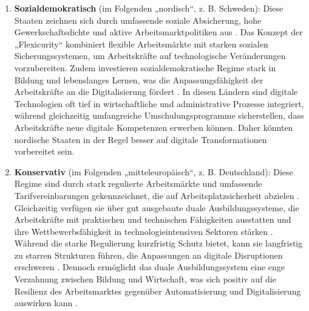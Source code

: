 \begin{enumerate}

    \item \textbf{Sozialdemokratisch} (im Folgenden „nordisch“, z. B. Schweden): Diese 
    Staaten zeichnen sich durch umfassende soziale Absicherung, hohe Gewerkschaftsdichte 
    und aktive Arbeitsmarktpolitiken aus \parencite[vgl.][S. 26]{espingandersen1990thethree}. 
    Das Konzept der „Flexicurity“ kombiniert flexible Arbeitsmärkte mit starken sozialen 
    Sicherungssystemen, um Arbeitskräfte auf technologische Veränderungen vorzubereiten. 
    Zudem investieren sozialdemokratische Regime stark in Bildung und lebenslanges Lernen, 
    was die Anpassungsfähigkeit der Arbeitskräfte an die Digitalisierung fördert 
    \parencite[vgl.][S. 56]{espingandersen1990thethree}. In diesen Ländern sind digitale 
    Technologien oft tief in wirtschaftliche und administrative Prozesse integriert, während 
    gleichzeitig umfangreiche Umschulungsprogramme sicherstellen, dass Arbeitskräfte neue 
    digitale Kompetenzen erwerben können. Daher könnten nordische Staaten in der Regel 
    besser auf digitale Transformationen vorbereitet sein.

    \item \textbf{Konservativ} (im Folgenden „mitteleuropäisch“, z. B. Deutschland): Diese 
    Regime sind durch stark regulierte Arbeitsmärkte und umfassende Tarifvereinbarungen 
    gekennzeichnet, die auf Arbeitsplatzsicherheit abzielen 
    \parencite[vgl.][S. 27]{espingandersen1990thethree}. Gleichzeitig verfügen sie über 
    gut ausgebaute duale Ausbildungssysteme, die Arbeitskräfte mit praktischen und 
    technischen Fähigkeiten ausstatten und ihre Wettbewerbsfähigkeit in technologieintensiven 
    Sektoren stärken \parencite[vgl.][S. 78]{hall2001varieties}. Während die starke 
    Regulierung kurzfristig Schutz bietet, kann sie langfristig zu starren Strukturen 
    führen, die Anpassungen an digitale Disruptionen erschweren 
    \parencite[vgl.][S. 20–21]{hall2001varieties}. Dennoch ermöglicht das duale 
    Ausbildungssystem eine enge Verzahnung zwischen Bildung und Wirtschaft, was sich 
    positiv auf die Resilienz des Arbeitsmarktes gegenüber Automatisierung und 
    Digitalisierung auswirken kann \parencite[vgl.][S. 25–27]{hall2001varieties}.


\end{enumerate}
